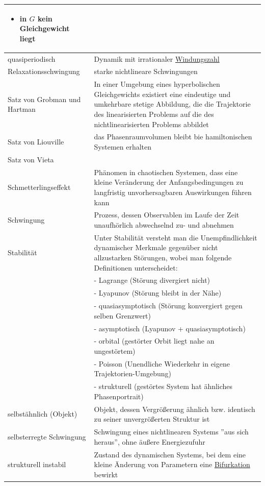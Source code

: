 \documentclass{article}
\begin{document}
\begin{xltabular}{\linewidth}{p{6cm}|X}
{\begin{itemize}
			
					\item in $G$ kein Gleichgewicht liegt
				\end{itemize}
		} \\
	\hline
		quasiperiodisch & Dynamik mit irrationaler \underline{Windungszahl} \\
	\hline
		Relaxationsschwingung & starke nichtlineare Schwingungen \\
	\hline
		Satz von Grobman und Hartman & In einer Umgebung eines hyperbolischen Gleichgewichts existiert eine eindeutige und umkehrbare stetige Abbildung, die die Trajektorie des linearisierten Problems auf die des nichtlinearisierten Problems abbildet \\
	\hline
		Satz von Liouville & das Phasenraumvolumen bleibt bie hamiltonischen Systemen erhalten \\
	\hline
		Satz von Vieta &  \\
	\hline
		Schmetterlingseffekt & Phänomen in chaotischen Systemen, dass eine kleine Veränderung der Anfangsbedingungen zu langfristig unvorhersagbaren Auswirkungen führen kann \\
	\hline
		Schwingung & Prozess, dessen Observablen im Laufe der Zeit unaufhörlich abwechselnd zu- und abnehmen \\
	\hline
		Stabilität & Unter Stabilität versteht man die Unempfindlichkeit dynamischer Merkmale gegenüber nicht allzustarken Störungen, wobei man folgende Definitionen unterscheidet: \\
		& - Lagrange (Störung divergiert nicht) \\
		& - Lyapunov (Störung bleibt in der Nähe) \\
		& - quasiasymptotisch (Störung konvergiert gegen selben Grenzwert) \\
		& - asymptotisch (Lyapunov + quasiasymptotisch) \\
		& - orbital (gestörter Orbit liegt nahe an ungestörtem) \\
		& - Poisson (Unendliche Wiederkehr in eigene Trajektorien-Umgebung) \\
		& - strukturell (gestörtes System hat ähnliches Phasenportrait) \\
	\hline
		selbstähnlich (Objekt) & Objekt, dessen Vergrößerung ähnlich bzw. identisch zu seiner unvergrößerten Struktur ist \\
	\hline
		selbsterregte Schwingung & Schwingung eines nichtlinearen Systems ''aus sich heraus'', ohne äußere Energiezufuhr \\
	\hline
		strukturell instabil & Zustand des dynamischen Systems, bei dem eine kleine Änderung von Parametern eine \underline{Bifurkation} bewirkt \\

\end{xltabular}
\end{document}
